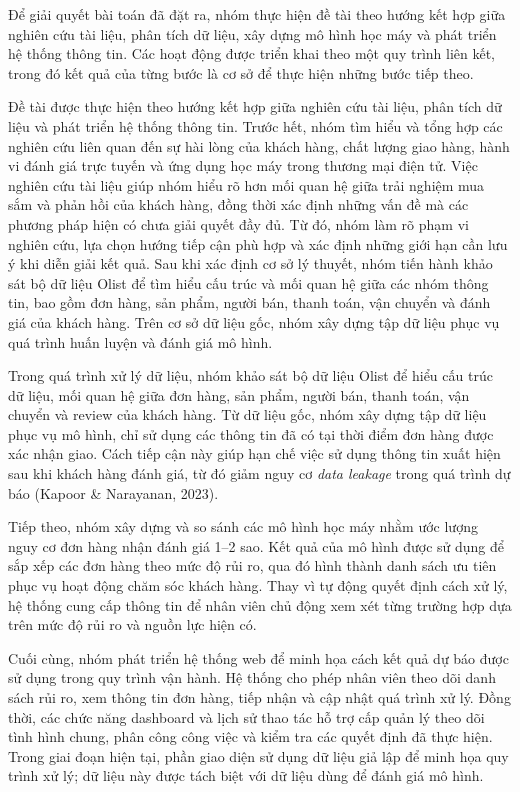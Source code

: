 \documentclass[12pt,a4paper]{report}
\begin{document}
Để giải quyết bài toán đã đặt ra, nhóm thực hiện đề tài theo hướng kết hợp giữa nghiên cứu tài liệu, phân tích dữ liệu, xây dựng mô hình học máy và phát triển hệ thống thông tin. Các hoạt động được triển khai theo một quy trình liên kết, trong đó kết quả của từng bước là cơ sở để thực hiện những bước tiếp theo.

Đề tài được thực hiện theo hướng kết hợp giữa nghiên cứu tài liệu, phân tích dữ liệu và phát triển hệ thống thông tin. Trước hết, nhóm tìm hiểu và tổng hợp các nghiên cứu liên quan đến sự hài lòng của khách hàng, chất lượng giao hàng, hành vi đánh giá trực tuyến và ứng dụng học máy trong thương mại điện tử. Việc nghiên cứu tài liệu giúp nhóm hiểu rõ hơn mối quan hệ giữa trải nghiệm mua sắm và phản hồi của khách hàng, đồng thời xác định những vấn đề mà các phương pháp hiện có chưa giải quyết đầy đủ. Từ đó, nhóm làm rõ phạm vi nghiên cứu, lựa chọn hướng tiếp cận phù hợp và xác định những giới hạn cần lưu ý khi diễn giải kết quả. Sau khi xác định cơ sở lý thuyết, nhóm tiến hành khảo sát bộ dữ liệu Olist để tìm hiểu cấu trúc và mối quan hệ giữa các nhóm thông tin, bao gồm đơn hàng, sản phẩm, người bán, thanh toán, vận chuyển và đánh giá của khách hàng. Trên cơ sở dữ liệu gốc, nhóm xây dựng tập dữ liệu phục vụ quá trình huấn luyện và đánh giá mô hình.

Trong quá trình xử lý dữ liệu, nhóm khảo sát bộ dữ liệu Olist để hiểu cấu trúc dữ liệu, mối quan hệ giữa đơn hàng, sản phẩm, người bán, thanh toán, vận chuyển và review của khách hàng. Từ dữ liệu gốc, nhóm xây dựng tập dữ liệu phục vụ mô hình, chỉ sử dụng các thông tin đã có tại thời điểm đơn hàng được xác nhận giao. Cách tiếp cận này giúp hạn chế việc sử dụng thông tin xuất hiện sau khi khách hàng đánh giá, từ đó giảm nguy cơ \emph{data leakage} trong quá trình dự báo (Kapoor \& Narayanan, 2023).

Tiếp theo, nhóm xây dựng và so sánh các mô hình học máy nhằm ước lượng nguy cơ đơn hàng nhận đánh giá 1–2 sao. Kết quả của mô hình được sử dụng để sắp xếp các đơn hàng theo mức độ rủi ro, qua đó hình thành danh sách ưu tiên phục vụ hoạt động chăm sóc khách hàng. Thay vì tự động quyết định cách xử lý, hệ thống cung cấp thông tin để nhân viên chủ động xem xét từng trường hợp dựa trên mức độ rủi ro và nguồn lực hiện có.

Cuối cùng, nhóm phát triển hệ thống web để minh họa cách kết quả dự báo được sử dụng trong quy trình vận hành. Hệ thống cho phép nhân viên theo dõi danh sách rủi ro, xem thông tin đơn hàng, tiếp nhận và cập nhật quá trình xử lý. Đồng thời, các chức năng dashboard và lịch sử thao tác hỗ trợ cấp quản lý theo dõi tình hình chung, phân công công việc và kiểm tra các quyết định đã thực hiện. Trong giai đoạn hiện tại, phần giao diện sử dụng dữ liệu giả lập để minh họa quy trình xử lý; dữ liệu này được tách biệt với dữ liệu dùng để đánh giá mô hình.
\end{document}
